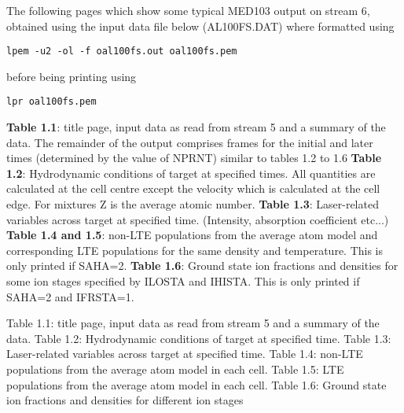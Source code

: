 The following pages which show some typical MED103 output on stream 6, obtained
using the input data file below (AL100FS.DAT) where formatted using
\begin{verbatim}
lpem -u2 -ol -f oal100fs.out oal100fs.pem
\end{verbatim}
before being printing using
\begin{verbatim}
lpr oal100fs.pem
\end{verbatim}
                                             
\newline
{\bf Table 1.1}: title page, input data as read from stream 5
and a summary of the data.
The remainder of the output comprises frames for the initial
and later times (determined by the value of NPRNT) similar to tables 1.2 to 1.6
\newline
{\bf Table 1.2}: Hydrodynamic conditions of target at specified times.
All quantities are calculated at the cell centre except the
velocity which is calculated at the cell edge.
For mixtures Z is the average atomic number.
\newline
{\bf Table 1.3}: Laser-related variables across target at specified time.
(Intensity, absorption coefficient etc...)
\newline
{\bf Table 1.4 and 1.5}: non-LTE populations from the average atom model
and corresponding LTE populations
for the same density and temperature.
This is only printed if SAHA=2.
\newline
{\bf Table 1.6}: Ground state ion fractions and densities for some ion stages
specified by ILOSTA and IHISTA. This is only printed if SAHA=2 and IFRSTA=1.

                                      
\newpage
\vspace*{9.15in}
Table 1.1: title page, input data as read from stream 5
and a summary of the data.
\newpage
\vspace*{9.15in}
Table 1.2: Hydrodynamic conditions of target at specified time.
\newpage
\vspace*{9.15in}
Table 1.3: Laser-related variables across target at specified time.
\newpage
\vspace*{9.15in}
Table 1.4: non-LTE populations from the average atom model
in each cell.
\newpage
\vspace*{9.15in}
Table 1.5: LTE populations from the average atom model
in each cell.
\newpage
\vspace*{9.15in}
Table 1.6: Ground state ion fractions and densities for different ion stages
 
